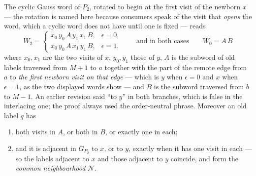 \begin{lemma}\label{lem:contactword}
The cyclic Gauss word of $P_2$, rotated to begin at the first visit of the
newborn $x$ --- the rotation is named here because consumers speak of the visit
that \emph{opens} the word, which a cyclic word does not have until one is
fixed --- reads
\begin{equation}
   W_2=\begin{cases}
     x_0\,y_0\,A\,y_1\,x_1\,B,&\epsilon=0,\\
     x_0\,y_0\,A\,x_1\,y_1\,B,&\epsilon=1,
   \end{cases}
   \qquad\text{and in both cases}\qquad
   W_0=A\,B
   \label{eq:contactword}
\end{equation}
where $x_0,x_1$ are the two visits of $x$, $y_0,y_1$ those of $y$, $A$ is the
subword of old labels traversed from $M+1$ to $a$ together with the part of the
remote edge from $a$ to \emph{the first newborn visit on that edge} --- which is
$y$ when $\epsilon=0$ and $x$ when $\epsilon=1$, as the two displayed words show
--- and $B$ is the subword traversed from $b$ to $M-1$. An earlier revision said
``to $y$'' in both branches, which is false in the interlacing one; the proof
always used the order-neutral phrase. Moreover an old label $q$ has
\begin{enumerate}
\item[(i)] both visits in $A$, or both in $B$, or exactly one in each;
\item[(ii)] and it is adjacent in $G_{P_2}$ to $x$, or to $y$, exactly when it
has one visit in each --- so the labels adjacent to $x$ and those adjacent to
$y$ coincide, and form the \emph{common neighbourhood} $\mathcal N$.
\end{enumerate}
\end{lemma}
